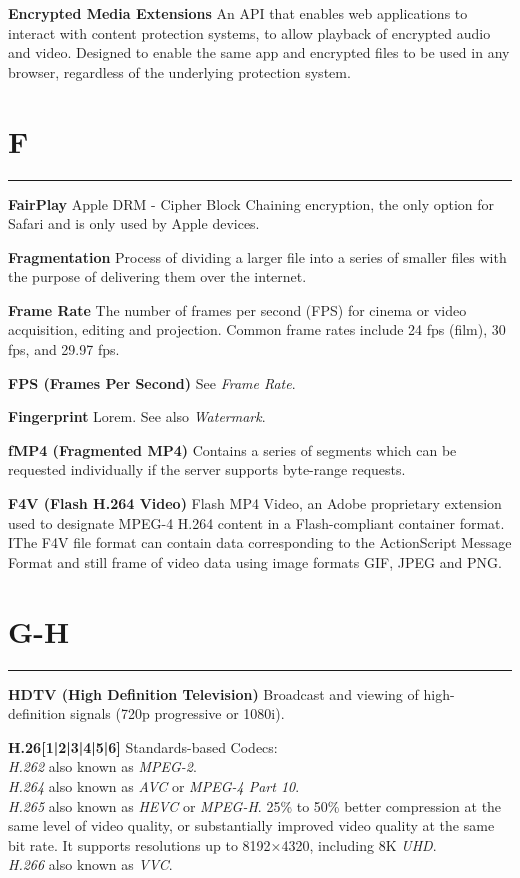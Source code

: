 \smallskip
\textbf{Encrypted Media Extensions}
An API that enables web applications to interact with content protection systems, to allow playback of encrypted audio and video. Designed to enable the same app and encrypted files to be used in any browser, regardless of the underlying protection system.

\section{F}
\hrule

\smallskip
\textbf{FairPlay}
Apple DRM - Cipher Block Chaining encryption, the only option for Safari and is only used by Apple devices.

\smallskip
\textbf{Fragmentation}
Process of dividing a larger file into a series of smaller files with the purpose of delivering them over the internet.

\textbf{Frame Rate}
The number of frames per second (FPS) for cinema or video acquisition, editing and projection. Common frame rates include 24 fps (film), 30 fps, and 29.97 fps.

\textbf{FPS (Frames Per Second)}
See \textit{Frame Rate}.

\smallskip
\textbf{Fingerprint}
Lorem. See also \textit{Watermark}.

\smallskip
\textbf{fMP4 (Fragmented MP4)}
Contains a series of segments which can be requested individually if the server supports byte-range requests.

\smallskip
\textbf{F4V (Flash H.264 Video)}
Flash MP4 Video, an Adobe proprietary extension used to designate MPEG-4 H.264 content in a Flash-compliant container format. IThe F4V file format can contain data corresponding to the ActionScript Message Format and still frame of video data using image formats GIF, JPEG and PNG.

\section{G-H}
\hrule

\smallskip
\textbf{HDTV (High Definition Television)}
Broadcast and viewing of high-definition signals (720p progressive or 1080i).

\smallskip
\textbf{H.26[1|2|3|4|5|6]}
Standards-based Codecs:\\
\textit{H.262} also known as \textit{MPEG-2}.\\
\textit{H.264} also known as \textit{AVC} or  \textit{MPEG-4 Part 10}.\\
\textit{H.265} also known as \textit{HEVC} or \textit{MPEG-H}. 25\% to 50\% better compression at the same level of video quality, or substantially improved video quality at the same bit rate. It supports resolutions up to 8192×4320, including 8K \textit{UHD}.\\
\textit{H.266} also known as \textit{VVC}.

